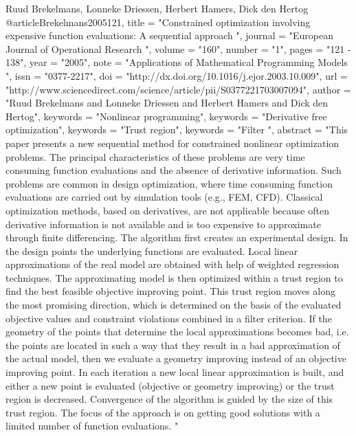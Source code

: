 Ruud Brekelmans, Lonneke Driessen, Herbert Hamers, Dick den Hertog
@article{Brekelmans2005121,
title = "Constrained optimization involving expensive function evaluations: A sequential approach ",
journal = "European Journal of Operational Research ",
volume = "160",
number = "1",
pages = "121 - 138",
year = "2005",
note = "Applications of Mathematical Programming Models ",
issn = "0377-2217",
doi = "http://dx.doi.org/10.1016/j.ejor.2003.10.009",
url = "http://www.sciencedirect.com/science/article/pii/S0377221703007094",
author = "Ruud Brekelmans and Lonneke Driessen and Herbert Hamers and Dick den Hertog",
keywords = "Nonlinear programming",
keywords = "Derivative free optimization",
keywords = "Trust region",
keywords = "Filter ",
abstract = "This paper presents a new sequential method for constrained nonlinear optimization problems. The principal characteristics of these problems are very time consuming function evaluations and the absence of derivative information. Such problems are common in design optimization, where time consuming function evaluations are carried out by simulation tools (e.g., FEM, CFD). Classical optimization methods, based on derivatives, are not applicable because often derivative information is not available and is too expensive to approximate through finite differencing. The algorithm first creates an experimental design. In the design points the underlying functions are evaluated. Local linear approximations of the real model are obtained with help of weighted regression techniques. The approximating model is then optimized within a trust region to find the best feasible objective improving point. This trust region moves along the most promising direction, which is determined on the basis of the evaluated objective values and constraint violations combined in a filter criterion. If the geometry of the points that determine the local approximations becomes bad, i.e. the points are located in such a way that they result in a bad approximation of the actual model, then we evaluate a geometry improving instead of an objective improving point. In each iteration a new local linear approximation is built, and either a new point is evaluated (objective or geometry improving) or the trust region is decreased. Convergence of the algorithm is guided by the size of this trust region. The focus of the approach is on getting good solutions with a limited number of function evaluations. "
}





